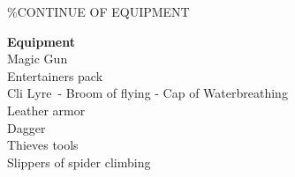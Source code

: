 \documentclass[11pt]{article}
\begin{document}
\%CONTINUE OF EQUIPMENT
\begin{minipage}[t]{.4\textwidth}\raggedleft
{\Large \textbf{ \Fontauri Equipment}}\\
Magic Gun \\
Entertainers pack\\
Cli Lyre\ - Broom of flying - Cap of Waterbreathing\\
Leather armor \\
Dagger\\
Thieves tools\\
Slippers of spider climbing\\
\end{minipage}
\end{document}
